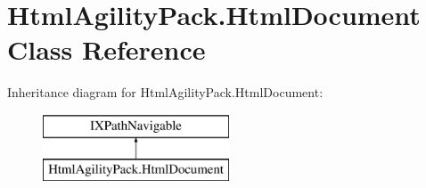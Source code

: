 \hypertarget{class_html_agility_pack_1_1_html_document}{}\section{Html\+Agility\+Pack.\+Html\+Document Class Reference}
\label{class_html_agility_pack_1_1_html_document}
Inheritance diagram for Html\+Agility\+Pack.\+Html\+Document\+:\begin{figure}[H]
\begin{center}
\leavevmode
\includegraphics[height=2.000000cm]{class_html_agility_pack_1_1_html_document}
\end{center}
\end{figure}

